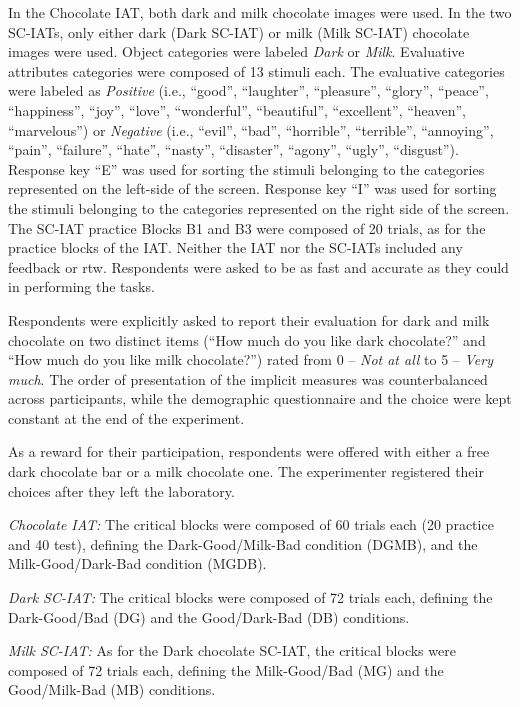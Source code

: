 \documentclass[12pt]{book}
\begin{document}
In the Chocolate IAT, both dark and milk chocolate images were used. 
In the two SC-IATs, only either dark (Dark SC-IAT) or milk (Milk SC-IAT) chocolate images were used. Object categories were labeled \emph{Dark} or \emph{Milk}. 
Evaluative attributes categories were composed of 13 stimuli each. The evaluative categories were labeled as \emph{Positive} (i.e., ``good'', ``laughter'', ``pleasure'', ``glory'', ``peace'', ``happiness'', ``joy'', ``love'', ``wonderful'', ``beautiful'', ``excellent'', ``heaven'', ``marvelous'') or \emph{Negative} (i.e., ``evil'', ``bad'', ``horrible'', ``terrible'', ``annoying'', ``pain'', ``failure'', ``hate'', ``nasty'', ``disaster'', ``agony'', ``ugly'', ``disgust'').  
Response key ``E'' was used for sorting the stimuli belonging to the categories represented on the left-side of the screen. Response key ``I'' was used for sorting the stimuli belonging to the categories represented on the right side of the screen.  
The SC-IAT practice Blocks B1 and B3 were composed of 20 trials, as for the practice blocks of the IAT. 
Neither the IAT nor the SC-IATs included any feedback or rtw. Respondents were asked to be as fast and accurate as they could in performing the tasks. 

Respondents were explicitly asked to report their evaluation for dark and milk chocolate on two distinct items (``How much do you like dark chocolate?'' and ``How much do you like milk chocolate?'') rated from 0 – \emph{Not at all} to 5 – \emph{Very much}. The order of presentation of the implicit measures was counterbalanced across participants, while the demographic questionnaire and the choice were kept constant at the end of the experiment.

As a reward for their participation, respondents were offered with either a free dark chocolate bar or a milk chocolate one. The experimenter registered their choices after they left the laboratory.

\noindent \emph{Chocolate IAT:}
The critical blocks were composed of 60 trials each (20 practice and 40 test), defining the Dark-Good/Milk-Bad condition (DGMB), and the Milk-Good/Dark-Bad condition (MGDB). 

\noindent \emph{Dark SC-IAT:} The critical blocks were composed of 72 trials each, defining the Dark-Good/Bad (DG) and the Good/Dark-Bad (DB) conditions.

\noindent \emph{Milk SC-IAT:} As for the Dark chocolate SC-IAT, the critical blocks were composed of 72 trials each, defining the Milk-Good/Bad (MG) and the Good/Milk-Bad (MB) conditions.
\end{document}

